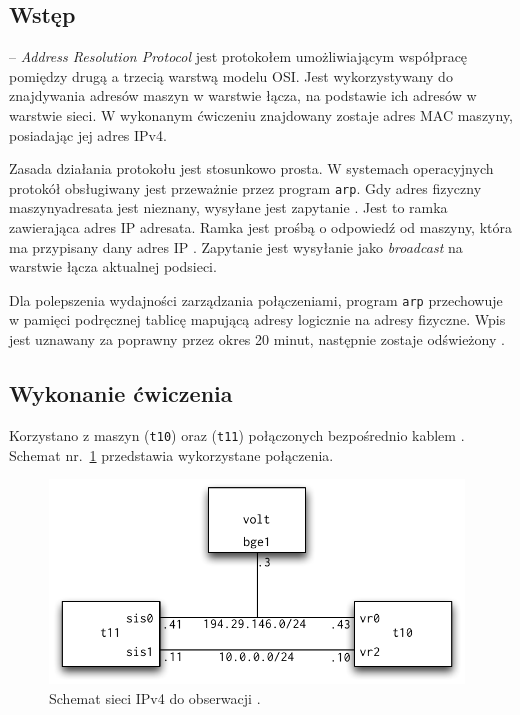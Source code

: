 \subsection{Wstęp}

\arp{} -- \emph{Address Resolution Protocol} jest protokołem umożliwiającym
współpracę pomiędzy drugą a trzecią warstwą modelu OSI. Jest wykorzystywany do
znajdywania adresów maszyn w warstwie łącza, na podstawie ich adresów w warstwie
sieci. W wykonanym ćwiczeniu znajdowany zostaje adres MAC maszyny, posiadając
jej adres IPv4.

Zasada działania protokołu \arp{} jest stosunkowo prosta. W systemach
operacyjnych protokół obsługiwany jest przeważnie przez program \texttt{arp}.
Gdy adres fizyczny maszyny\dywiz adresata jest nieznany, wysyłane jest zapytanie
\arp. Jest to ramka \eth{} zawierająca adres IP adresata. Ramka jest prośbą o
odpowiedź od maszyny, która ma przypisany dany adres IP
\cite{arp:stevens_arp_przyklad}. Zapytanie jest wysyłanie jako \emph{broadcast}
na warstwie łącza aktualnej podsieci.

Dla polepszenia wydajności zarządzania połączeniami, program \texttt{arp}
przechowuje w pamięci podręcznej tablicę mapującą adresy logicznie na adresy
fizyczne. Wpis jest uznawany za poprawny przez okres 20 minut, następnie zostaje
odświeżony \cite{arp:stevens_arp_cache}.

\subsection{Wykonanie ćwiczenia}

Korzystano z maszyn \tjz{} (\texttt{t10}) oraz \tjj{} (\texttt{t11}) połączonych
bezpośrednio kablem \eth. Schemat nr.~\ref{fig:arp:schemat-po-konfiguracji}
przedstawia wykorzystane połączenia.

\begin{figure}[h!]
  \centering
  \includegraphics[width=11cm]{figury/arp/schemat-po-konfiguracji.pdf}
  \caption{Schemat sieci IPv4 do obserwacji \arp.}
  \label{fig:arp:schemat-po-konfiguracji}
\end{figure}

